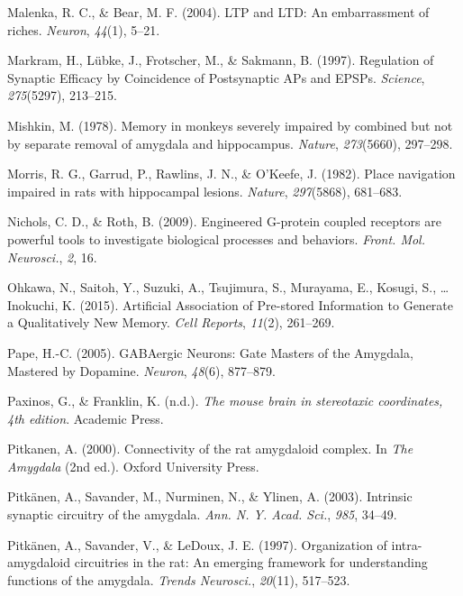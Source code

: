 \documentclass[12pt,a4paper,]{report}
\begin{document}
\hypertarget{ref-malenkaux5fltpux5f2004}{}
Malenka, R. C., \& Bear, M. F. (2004). LTP and LTD: An embarrassment of
riches. \emph{Neuron}, \emph{44}(1), 5--21.

\hypertarget{ref-markramux5fregulationux5f1997}{}
Markram, H., Lübke, J., Frotscher, M., \& Sakmann, B. (1997). Regulation
of Synaptic Efficacy by Coincidence of Postsynaptic APs and EPSPs.
\emph{Science}, \emph{275}(5297), 213--215.

\hypertarget{ref-mishkinux5fmemoryux5f1978}{}
Mishkin, M. (1978). Memory in monkeys severely impaired by combined but
not by separate removal of amygdala and hippocampus. \emph{Nature},
\emph{273}(5660), 297--298.

\hypertarget{ref-morrisux5fplaceux5f1982-1}{}
Morris, R. G., Garrud, P., Rawlins, J. N., \& O'Keefe, J. (1982). Place
navigation impaired in rats with hippocampal lesions. \emph{Nature},
\emph{297}(5868), 681--683.

\hypertarget{ref-nicholsux5fengineeredux5f2009}{}
Nichols, C. D., \& Roth, B. (2009). Engineered G-protein coupled
receptors are powerful tools to investigate biological processes and
behaviors. \emph{Front. Mol. Neurosci.}, \emph{2}, 16.

\hypertarget{ref-ohkawaux5fartificialux5f2015}{}
Ohkawa, N., Saitoh, Y., Suzuki, A., Tsujimura, S., Murayama, E., Kosugi,
S., \ldots{} Inokuchi, K. (2015). Artificial Association of Pre-stored
Information to Generate a Qualitatively New Memory. \emph{Cell Reports},
\emph{11}(2), 261--269.

\hypertarget{ref-papeux5fgabaergicux5f2005}{}
Pape, H.-C. (2005). GABAergic Neurons: Gate Masters of the Amygdala,
Mastered by Dopamine. \emph{Neuron}, \emph{48}(6), 877--879.

\hypertarget{ref-paxinosux5fmouseux5f2010}{}
Paxinos, G., \& Franklin, K. (n.d.). \emph{The mouse brain in
stereotaxic coordinates, 4th edition}. Academic Press.

\hypertarget{ref-pitkanenux5fconnectivityux5f2000}{}
Pitkanen, A. (2000). Connectivity of the rat amygdaloid complex. In
\emph{The Amygdala} (2nd ed.). Oxford University Press.

\hypertarget{ref-pitkanenux5fintrinsicux5f2003}{}
Pitkänen, A., Savander, M., Nurminen, N., \& Ylinen, A. (2003).
Intrinsic synaptic circuitry of the amygdala. \emph{Ann. N. Y. Acad.
Sci.}, \emph{985}, 34--49.

\hypertarget{ref-pitkanenux5forganizationux5f1997}{}
Pitkänen, A., Savander, V., \& LeDoux, J. E. (1997). Organization of
intra-amygdaloid circuitries in the rat: An emerging framework for
understanding functions of the amygdala. \emph{Trends Neurosci.},
\emph{20}(11), 517--523.
\end{document}
